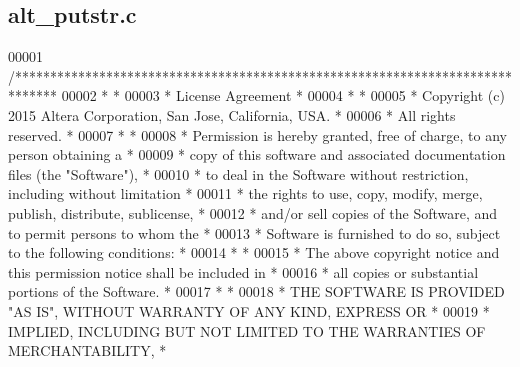 \subsection{alt\+\_\+putstr.\+c}
\label{alt__putstr_8c_source}

\begin{DoxyCode}
00001 \textcolor{comment}{/******************************************************************************}
00002 \textcolor{comment}{*                                                                             *}
00003 \textcolor{comment}{* License Agreement                                                           *}
00004 \textcolor{comment}{*                                                                             *}
00005 \textcolor{comment}{* Copyright (c) 2015 Altera Corporation, San Jose, California, USA.           *}
00006 \textcolor{comment}{* All rights reserved.                                                        *}
00007 \textcolor{comment}{*                                                                             *}
00008 \textcolor{comment}{* Permission is hereby granted, free of charge, to any person obtaining a     *}
00009 \textcolor{comment}{* copy of this software and associated documentation files (the "Software"),  *}
00010 \textcolor{comment}{* to deal in the Software without restriction, including without limitation   *}
00011 \textcolor{comment}{* the rights to use, copy, modify, merge, publish, distribute, sublicense,    *}
00012 \textcolor{comment}{* and/or sell copies of the Software, and to permit persons to whom the       *}
00013 \textcolor{comment}{* Software is furnished to do so, subject to the following conditions:        *}
00014 \textcolor{comment}{*                                                                             *}
00015 \textcolor{comment}{* The above copyright notice and this permission notice shall be included in  *}
00016 \textcolor{comment}{* all copies or substantial portions of the Software.                         *}
00017 \textcolor{comment}{*                                                                             *}
00018 \textcolor{comment}{* THE SOFTWARE IS PROVIDED "AS IS", WITHOUT WARRANTY OF ANY KIND, EXPRESS OR  *}
00019 \textcolor{comment}{* IMPLIED, INCLUDING BUT NOT LIMITED TO THE WARRANTIES OF MERCHANTABILITY,    *}

\end{DoxyCode}
